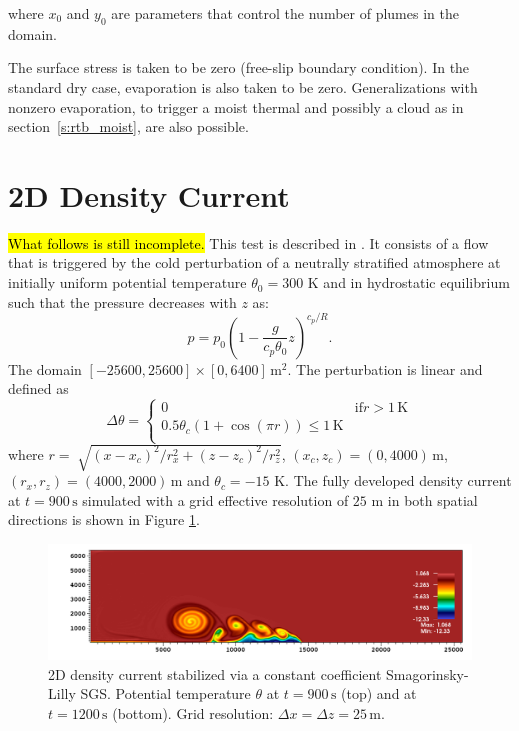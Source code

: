 \documentclass{report}
\begin{document}
where $x_{0}$ and $y_{0}$ are parameters that control the number of plumes in the domain.  

The surface stress is taken to be zero (free-slip boundary condition). In the standard dry case, evaporation is also taken to be zero. Generalizations with nonzero evaporation, to trigger a moist thermal and possibly a cloud as in section~\ref{s:rtb_moist}, are also possible. 

\section{2D Density Current}

\hl{What follows is still incomplete.}
This test is described in \cite{strakaWilhelmson1993}. It consists of a flow that is triggered by the cold perturbation of a neutrally stratified atmosphere at initially uniform potential temperature $\theta_0 = 300$ K
and in hydrostatic equilibrium such that the pressure decreases with $z$ as:
\begin{equation}
\label{pressureDistrib2}
p = p_{0}\left(1-\frac{g}{c_p{\theta_{0}}}z\right)^{c_p/R}.
\end{equation}
The domain $[-25600,25600]\times[0,6400]\,\mathrm{m}^2$.
The perturbation is linear and defined as
\begin{equation}
 \Delta\theta = \left\{ \begin{array}{ll}
 0 & \mathrm{if } r > 1\,{\mathrm K}\\
 0.5 \theta_c \left(1 + \cos(\pi r) \right) \leq 1\,{\mathrm K}\\
\end{array} \right.
\label{eq:robertIni2}
\end{equation}
where $r = \sqrt[]{(x-x_{c})^2/r_x^{2} + (z-z_{c})^{2}/r_z^2}$, $(x_c,z_c) = (0,4000)\,\mathrm{m}$, $(r_x, r_z) = (4000, 2000)\,\mathrm{m}$ and $\theta_c=-15$ K. The fully developed density current at $t=900\,\mathrm{s}$ simulated with a grid effective resolution of $25$ m in both spatial directions is shown in Figure \ref{fig:benchmarks/dc25msmago}.

\begin{figure}[htbp]
\includegraphics[width=1.2\textwidth]{figures/DC-smgo-25mx25m-900s0000.png}
\caption{2D density current stabilized via a constant coefficient Smagorinsky-Lilly SGS. Potential temperature $\theta$ at $t=900\,\mathrm{s}$ (top) and at $t=1200\,\mathrm{s}$ (bottom). Grid resolution: $\Delta x = \Delta z = 25\,\mathrm{m}$. 
}
\label{fig:benchmarks/dc25msmago}
\end{figure}
\end{document}
